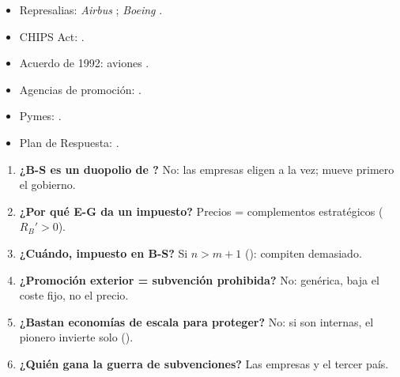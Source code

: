 \documentclass{article}
\begin{document}
\begin{columnas}
\anexorepaso
{}
\begin{itemize}
\item Represalias: \emph{Airbus} ; \emph{Boeing} .
\item CHIPS Act: .
\item Acuerdo de 1992: aviones .
\item Agencias de promoción: .
\item Pymes: .
\item Plan de Respuesta: .
\end{itemize}
\begin{enumerate}
\item \textbf{¿B-S es un duopolio de ?} No: las empresas eligen a la vez; mueve primero el gobierno.
\item \textbf{¿Por qué E-G da un impuesto?} Precios = complementos estratégicos ($R_B'>0$).
\item \textbf{¿Cuándo, impuesto en B-S?} Si $n>m+1$ (): compiten demasiado.
\item \textbf{¿Promoción exterior = subvención prohibida?} No: genérica, baja el coste fijo, no el precio.
\item \textbf{¿Bastan economías de escala para proteger?} No: si son internas, el pionero invierte solo ().
\item \textbf{¿Quién gana la guerra de subvenciones?} Las empresas y el tercer país.
\end{enumerate}
\begin{trampa}
\begin{itemize}

\end{itemize}
\end{trampa}
\end{columnas}
\end{document}
